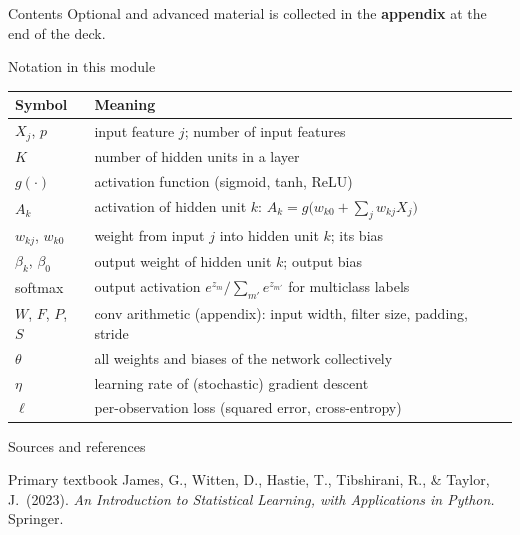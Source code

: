 \documentclass[aspectratio=169,11pt]{beamer}
\begin{document}
\begin{frame}{Contents}\footnotesize\tableofcontents[hideallsubsections]
  \vfill
  {\tiny Optional and advanced material is collected in the \textbf{appendix} at the end of the deck.}
\end{frame}

\begin{frame}{Notation in this module}
  \footnotesize
  \begin{center}
  \begin{tabular}{@{}ll@{}}
    \toprule
    \textbf{Symbol} & \textbf{Meaning} \\
    \midrule
    $X_j$, $p$ & input feature $j$; number of input features \\
    $K$ & number of hidden units in a layer \\
    $g(\cdot)$ & activation function (sigmoid, tanh, ReLU) \\
    $A_k$ & activation of hidden unit $k$: $A_k=g\big(w_{k0}+\sum_j w_{kj}X_j\big)$ \\
    $w_{kj}$, $w_{k0}$ & weight from input $j$ into hidden unit $k$; its bias \\
    $\beta_k$, $\beta_0$ & output weight of hidden unit $k$; output bias \\
    softmax & output activation $e^{z_m}/\sum_{m'} e^{z_{m'}}$ for multiclass labels \\
    $W$, $F$, $P$, $S$ & conv arithmetic (appendix): input width, filter size, padding, stride \\
    $\theta$ & all weights and biases of the network collectively \\
    $\eta$ & learning rate of (stochastic) gradient descent \\
    $\ell$ & per-observation loss (squared error, cross-entropy) \\
    \bottomrule
  \end{tabular}
  \end{center}
\end{frame}

\begin{frame}{Sources and references}
  \begin{block}{Primary textbook}
    James, G., Witten, D., Hastie, T., Tibshirani, R., \& Taylor, J.\ (2023).
    \emph{An Introduction to Statistical Learning, with Applications in
    Python.} Springer.
  \end{block}
\end{frame}
\end{document}
